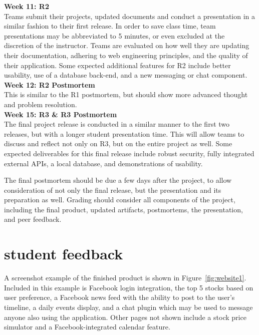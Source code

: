 \documentclass{sig-alternate}
\begin{document}
\textbf{Week 11: R2}\\
Teams submit their projects, updated documents and conduct a presentation in a similar fashion to their first release. In order to save class time, team presentations may be abbreviated to 5 minutes, or even excluded at the discretion of the instructor. Teams are evaluated on how well they are updating their documentation, adhering to web engineering principles, and the quality of their application. Some expected additional features for R2 include better usability, use of a database back-end, and a new messaging or chat component.\\


\textbf{Week 12: R2 Postmortem}\\
This is similar to the R1 postmortem, but should show more advanced thought and problem resolution. \\

\textbf{Week 15: R3 \& R3 Postmortem}\\
The final project release is conducted in a similar manner to the first two releases, but with a longer student presentation time. This will allow teams to discuss and reflect not only on R3, but on the entire project as well. Some expected deliverables for this final release include robust security, fully integrated external APIs, a local database, and demonstrations of usability.


The final postmortem should be due a few days after the project, to allow consideration of not only the final release, but the presentation and its preparation as well. Grading should consider all components of the project, including the final product, updated artifacts, postmortems, the presentation, and peer feedback. \\


\section{student feedback}
\label{sec: studentfeedback}

A screenshot example of the finished product is shown in Figure~\ref{fig:website1}. Included in this example is Facebook login integration, the top 5 stocks based on user preference, a Facebook news feed with the ability to post to the user's timeline, a daily events display, and a chat plugin which may be used to message anyone also using the application.  Other pages not shown include a stock price simulator and a Facebook-integrated calendar feature.
\end{document}
